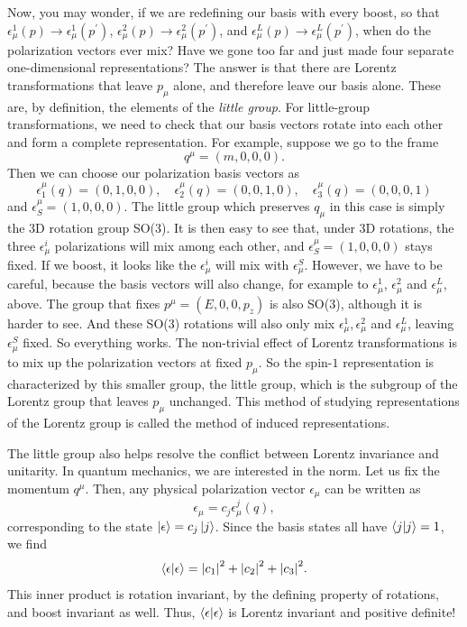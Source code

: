 \documentclass[11pt]{article}
\theoremstyle{definition}
\begin{document}
Now, you may wonder, if we are redefining our basis with every boost, so that \(\epsilon^{1}_{\mu}(p)\rightarrow\epsilon^{1}_{\mu}(p^{\prime})\), \(\epsilon^{2}_{\mu}(p)\rightarrow\epsilon^{2}_{\mu}(p^{\prime})\), and \(\epsilon^{L}_{\mu}(p)\rightarrow\epsilon^{L}_{\mu}(p^{\prime})\), when do the polarization vectors ever mix? Have we gone too far and just made four separate one-dimensional representations? The answer is that there are Lorentz transformations that leave \(p_{\mu}\) alone, and therefore leave our basis alone. These are, by definition, the elements of the \textit{little group}. For little-group transformations, we need to check that our basis vectors rotate into each other and form a complete representation. For example, suppose we go to the frame
\begin{equation}
    q^{\mu}=(m,0,0,0).
\end{equation}
Then we can choose our polarization basis vectors as
\begin{equation}
    \epsilon^{\mu}_{1}(q)=(0,1,0,0),\quad\epsilon^{\mu}_{2}(q)=(0,0,1,0),\quad\epsilon^{\mu}_{3}(q)=(0,0,0,1)    
\end{equation}
and \(\epsilon^{\mu}_{S}=(1,0,0,0)\). The little group which preserves \(q_{\mu}\) in this case is simply the 3D rotation group SO(3). It is then easy to see that, under 3D rotations, the three \(\epsilon^{i}_{\mu}\) polarizations will mix among each other, and \(\epsilon^{\mu}_{S}=(1,0,0,0)\) stays fixed. If we boost, it looks like the \(\epsilon^{i}_{\mu}\) will mix with \(\epsilon^{S}_{\mu}\). However, we have to be careful, because the basis vectors will also change, for example to \(\epsilon^{1}_{\mu}\), \(\epsilon^{2}_{\mu}\) and \(\epsilon^{L}_{\mu}\), above. The group that fixes \(p^{\mu}=(E,0,0,p_{z})\) is also SO(3), although it is harder to see. And these SO(3) rotations will also only mix \(\epsilon^{1}_{\mu},\epsilon^{2}_{\mu}\) and \(\epsilon^{L}_{\mu}\), leaving \(\epsilon^{S}_{\mu}\) fixed. So everything works. The non-trivial effect of Lorentz transformations is to mix up the polarization vectors at fixed \(p_{\mu}\). So the spin-\(1\) representation is characterized by this smaller group, the little group, which is the subgroup of the Lorentz group that leaves \(p_{\mu}\) unchanged. This method of studying representations of the Lorentz group is called the method of induced representations.

The little group also helps resolve the conflict between Lorentz invariance and unitarity. In quantum mechanics, we are interested in the norm. Let us fix the momentum $q^\mu$. Then, any physical polarization vector $\epsilon_\mu$ can be written as 
\begin{equation}
    \epsilon_\mu = c_j \epsilon_\mu^j(q),
\end{equation}
corresponding to the state $\ket{\epsilon} = c_j\ket{j}$. Since the basis states all have $\braket{j}{j} = 1$, we find
\begin{equation}
    \braket{\epsilon}{\epsilon} = \abs{c_1}^2 + \abs{c_2}^2 + \abs{c_3}^2.
\end{equation}
This inner product is rotation invariant, by the defining property of rotations, and boost invariant as well. Thus, $\braket{\epsilon}{\epsilon}$ is Lorentz invariant and positive definite!
\end{document}
